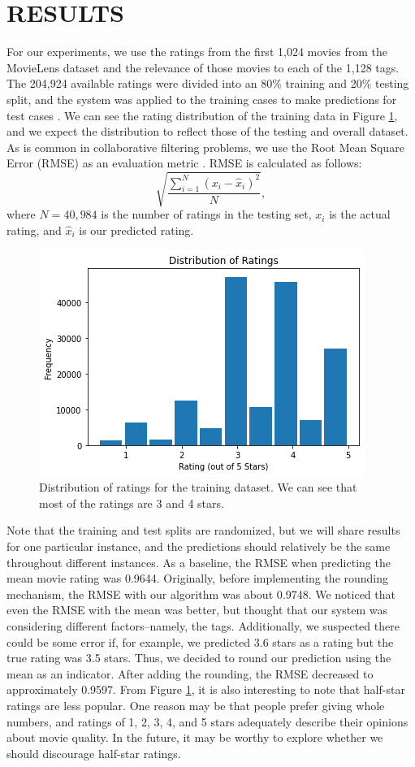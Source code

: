 \documentclass[letterpaper, 10 pt, conference]{ieeeconf}  %
\begin{document}
\medbreak
\section{RESULTS}

For our experiments, we use the ratings from the first 1,024 movies from the MovieLens dataset and the relevance of those movies to each of the 1,128 tags. The 204,924 available ratings were divided into an 80\% training and 20\% testing split, and the system was applied to the training cases to make predictions for test cases \cite{lenskitmodule}. We can see the rating distribution of the training data in Figure \ref{ratingdist}, and we expect the distribution to reflect those of the testing and overall dataset. As is common in collaborative filtering problems, we use the Root Mean Square Error (RMSE) as an evaluation metric \cite{lenskitmodule}. RMSE is calculated as follows: 
$$\sqrt{\frac{\sum_{i=1}^N (x_i - \hat{x}_i)^2}{N}},$$
where $N=40,984$ is the number of ratings in the testing set, $x_i$ is the actual rating, and $\hat{x}_i$ is our predicted rating.

\begin{figure}[h]
    \includegraphics[scale=0.6]{figs/ratingdist.png}
    \caption{Distribution of ratings for the training dataset. We can see that most of the ratings are 3 and 4 stars.}
    \label{ratingdist}
\end{figure}

Note that the training and test splits are randomized, but we will share results for one particular instance, and the predictions should relatively be the same throughout different instances. As a baseline, the RMSE when predicting the mean movie rating was 0.9644. Originally, before implementing the rounding mechanism, the RMSE with our algorithm was about 0.9748. We noticed that even the RMSE with the mean was better, but thought that our system was considering different factors--namely, the tags. Additionally, we suspected there could be some error if, for example, we predicted 3.6 stars as a rating but the true rating was 3.5 stars. Thus, we decided to round our prediction using the mean as an indicator. After adding the rounding, the RMSE decreased to approximately 0.9597. 
From Figure \ref{ratingdist}, it is also interesting to note that half-star ratings are less popular. One reason may be that people prefer giving whole numbers, and ratings of 1, 2, 3, 4, and 5 stars adequately describe their opinions about movie quality. In the future, it may be worthy to explore whether we should discourage half-star ratings.
\end{document}
